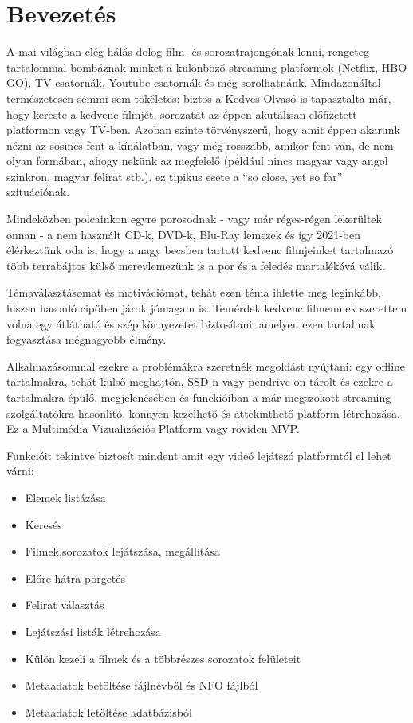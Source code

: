 \chapter{Bevezetés} %
\label{ch:intro}

A mai világban elég hálás dolog film- és sorozatrajongónak lenni, rengeteg tartalommal bombáznak minket a különböző streaming platformok (Netflix, HBO GO), TV csatornák, Youtube csatornák és még sorolhatnánk. Mindazonáltal természetesen semmi sem tökéletes: biztos a Kedves Olvasó is tapasztalta már, hogy kereste a kedvenc filmjét, sorozatát az éppen akutálisan előfizetett platformon vagy TV-ben. Azoban szinte törvényszerű, hogy amit éppen akarunk nézni az sosincs fent a kínálatban, vagy még rosszabb, amikor fent van, de nem olyan formában, ahogy nekünk az megfelelő (például nincs magyar vagy angol szinkron, magyar felirat stb.), ez tipikus esete a ``so close, yet so far'' szituációnak.

Mindeközben polcainkon egyre porosodnak - vagy már réges-régen lekerültek onnan - a nem használt CD-k, DVD-k, Blu-Ray lemezek és így 2021-ben élérkeztünk oda is, hogy a nagy becsben tartott kedvenc filmjeinket tartalmazó több terrabájtos külső merevlemezünk is a por és a feledés martalékává válik.

Témaválasztásomat és motivációmat, tehát ezen téma ihlette meg leginkább, hiszen hasonló cipőben járok jómagam is. Temérdek kedvenc filmemnek szerettem volna egy átlátható és szép környezetet biztosítani, amelyen ezen tartalmak fogyasztása mégnagyobb élmény.

Alkalmazásommal ezekre a problémákra szeretnék megoldást nyújtani: egy offline tartalmakra, tehát külső meghajtón, SSD-n vagy pendrive-on tárolt és ezekre a tartalmakra épülő, megjelenésében és funckióiban a már megszokott streaming szolgáltatókra hasonlító, könnyen kezelhető és áttekinthető platform létrehozása.\\
Ez a Multimédia Vizualizációs Platform vagy röviden MVP.

Funkcióit tekintve biztosít mindent amit egy videó lejátszó platformtól el lehet várni:
\begin{itemize}
    \item Elemek listázása
    \item Keresés
	\item Filmek,sorozatok lejátszása, megállítása
	\item Előre-hátra pörgetés
	\item Felirat választás
	\item Lejátszási listák létrehozása
	\item Külön kezeli a filmek és a többrészes sorozatok felületeit
	\item Metaadatok betöltése fájlnévből és NFO fájlból
	\item Metaadatok letöltése adatbázisból
\end{itemize}

